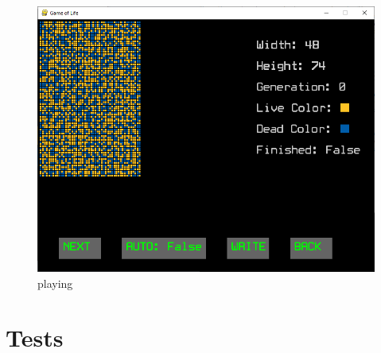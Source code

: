\documentclass[12pt]{report}
\begin{document}
\begin{figure}[ht]
    \centering
    \includegraphics[width=\textwidth]{play}
    \caption{playing}
\end{figure}

\chapter{Tests}
\end{document}
